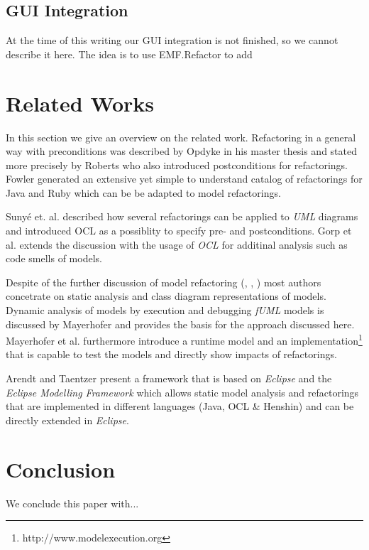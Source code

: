 \documentclass{llncs}
\begin{document}
\subsection{GUI Integration}
At the time of this writing our GUI integration is not finished, so we cannot describe it here. The idea is to use EMF.Refactor to add 

\section{Related Works}

In this section we give an overview on the related work. Refactoring in a general way with preconditions was described
by Opdyke \cite{mast:REFOOF} in his master thesis and stated more precisely by Roberts \cite{rob99} who also introduced
postconditions for refactorings. Fowler \cite{fow99} generated an extensive yet simple to understand catalog of
refactorings for Java and Ruby which can be be adapted to model refactorings.


Suny{\'e} et. al. \cite{DBLP:conf/uml/SunyePTJ01} described how several refactorings can be applied to \textit{UML}
diagrams and introduced OCL as a possiblity to specify pre- and postconditions. Gorp et al. \cite{gorp03} extends the
discussion with the usage of \textit{OCL} for additinal analysis such as code smells of models.


Despite of the further discussion of model refactoring (\cite{DBLP:conf/uml/CorreaW04}, \cite{DBLP:conf/ershov/BaarM06},
\cite{DBLP:journals/ase/ArendtT13}) most authors concetrate on static analysis and class diagram representations of
models. Dynamic analysis of models by execution and debugging \textit{fUML} models is discussed by Mayerhofer
\cite{DBLP:conf/icse/Mayerhofer12} and provides the basis for the approach discussed here. Mayerhofer et al.
\cite{DBLP:conf/models/MayerhoferLK12} furthermore introduce a runtime model and an
implementation\footnote{http://www.modelexecution.org} that is capable to test the models and directly show impacts of
refactorings.


Arendt and Taentzer \cite{DBLP:journals/ase/ArendtT13} present a framework that is based on \textit{Eclipse} and the
\textit{Eclipse Modelling Framework} which allows static model analysis and refactorings that are implemented in
different languages (Java, OCL \& Henshin) and can be directly extended in \textit{Eclipse}.


\section{Conclusion}
We conclude this paper with...

\newpage


\end{document}
